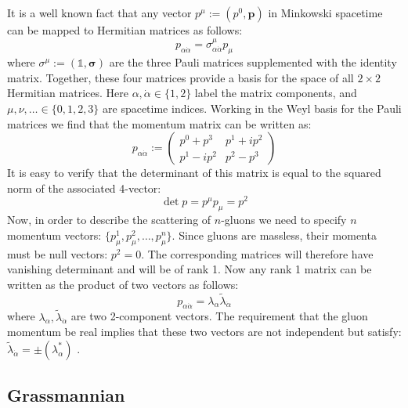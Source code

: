 \documentclass[twocolumn,final,aps,nofootinbib,nobibnotes]{revtex4-2}
\newcommand{\id}{\mathbb{1}}
\newcommand{\vect}[1]{\boldsymbol{#1}}
\begin{document}
It is a well known fact that any vector $ p^\mu := (p^0,\vect{p}) $ in Minkowski spacetime can be mapped to Hermitian matrices as follows:
\begin{equation}\label{eqn:spinor-mapping}
	p_{\alpha \dot \alpha} = \sigma^\mu_{\alpha \dot \alpha} p_\mu
\end{equation}
where $ \sigma^\mu := (\id, \vect{\sigma}) $ are the three Pauli matrices supplemented with the identity matrix. Together, these four matrices provide a basis for the space of all $ 2 \times 2 $ Hermitian matrices. Here $ \alpha, \dot \alpha \in \{1,2\} $ label the matrix components, and $ \mu, \nu, \ldots \in \{0,1,2,3\} $ are spacetime indices. Working in the Weyl basis for the Pauli matrices we find that the momentum matrix can be written as:
\begin{equation}\label{eqn:momentum-matrix}
	p_{\alpha \dot \alpha} := \begin{pmatrix}
		p^0 + p^3 & p^1 + i p^2 \\
		p^1 - i p^2 & p^2 - p^3
		\end{pmatrix}
\end{equation}
It is easy to verify that the determinant of this matrix is equal to the squared norm of the associated 4-vector:
\begin{equation}\label{eqn:mom-determinant}
	\det{p} = p^\mu p_\mu = p^2
\end{equation}
Now, in order to describe the scattering of $ n $-gluons we need to specify $ n $ momentum vectors: $ \{p^1_\mu, p^2_\mu, \ldots, p^n_\mu\} $. Since gluons are massless, their momenta must be null vectors: $ p^2 = 0 $. The corresponding matrices will therefore have vanishing determinant and will be of rank 1. Now any rank 1 matrix can be written as the product of two vectors as follows:
\begin{equation}\label{eqn:null-momenta}
	p_{\alpha \dot \alpha} = \lambda_\alpha \tilde{\lambda}_{\dot \alpha}
\end{equation}
where $ \lambda_\alpha, \tilde \lambda_{\dot \alpha} $ are two 2-component vectors. The requirement that the gluon momentum be real implies that these two vectors are not independent but satisfy: $ \tilde \lambda_{\dot \alpha} = \pm (\lambda^*_\alpha) $ \cite{Arkani-Hamed2017Scattering}.

\subsection{Grassmannian}\label{sec:grassmannian}
\end{document}
